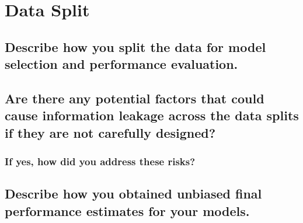 
\section{Data Split} 
\label{sec:Data Split}






\subsection{Describe how you split the data for model selection and performance evaluation. }
\label{sec:Data Split:a}






\subsection{Are there any potential factors that could cause information leakage across the data splits if they are not carefully designed? }
\label{sec:Data Split:b}



\subsubsection{If yes, how did you address these risks? }
\label{sec:Data Split:b-1}






\subsection{Describe how you obtained unbiased final performance estimates for your models. }
\label{sec:Data Split:c}



